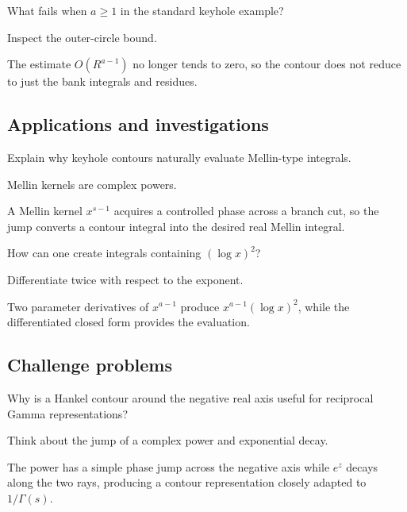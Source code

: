 \begin{exercise}\label{exr:iv21-expand-12}
What fails when \(a\ge1\) in the standard keyhole example?
\end{exercise}
\begin{hint}
Inspect the outer-circle bound.
\end{hint}
\begin{solution}
The estimate \(O(R^{a-1})\) no longer tends to zero, so the contour does not reduce to just the bank integrals and residues.
\end{solution}

\subsection*{Applications and investigations}

\begin{exercise}\label{exr:iv21-expand-13}
Explain why keyhole contours naturally evaluate Mellin-type integrals.
\end{exercise}
\begin{hint}
Mellin kernels are complex powers.
\end{hint}
\begin{solution}
A Mellin kernel \(x^{s-1}\) acquires a controlled phase across a branch cut, so the jump converts a contour integral into the desired real Mellin integral.
\end{solution}

\begin{exercise}\label{exr:iv21-expand-14}
How can one create integrals containing \((\log x)^2\)?
\end{exercise}
\begin{hint}
Differentiate twice with respect to the exponent.
\end{hint}
\begin{solution}
Two parameter derivatives of \(x^{a-1}\) produce \(x^{a-1}(\log x)^2\), while the differentiated closed form provides the evaluation.
\end{solution}

\subsection*{Challenge problems}

\begin{exercise}\label{exr:iv21-expand-15}
Why is a Hankel contour around the negative real axis useful for reciprocal Gamma representations?
\end{exercise}
\begin{hint}
Think about the jump of a complex power and exponential decay.
\end{hint}
\begin{solution}
The power has a simple phase jump across the negative axis while \(e^z\) decays along the two rays, producing a contour representation closely adapted to \(1/\Gamma(s)\).
\end{solution}

